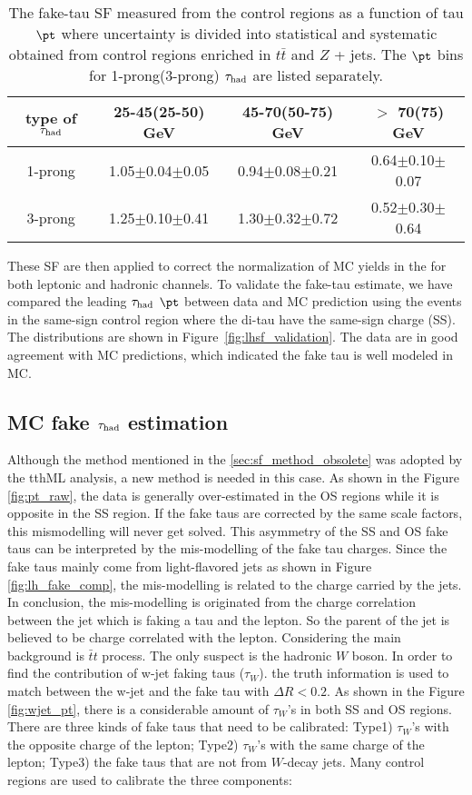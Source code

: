 \begin{table}[htb]
\caption{ The fake-tau SF measured from the control regions as a function of tau $\pt$ where uncertainty is divided into statistical and 
systematic obtained from control regions enriched in $t\bar t$ and $Z$ + jets. The $\pt$ bins for 1-prong(3-prong) $\tau_\text{had}$ are listed separately.}
\centering
\begin{tabular}{|c|c|c|c|} \hline
type of $\tau_\text{had}$  & 25-45(25-50) GeV & 45-70(50-75) GeV  & $>$ 70(75) GeV \\ \hline
1-prong & 1.05$\pm$0.04$\pm$0.05 & 0.94$\pm$0.08$\pm$0.21 & 0.64$\pm$0.10$\pm$0.07 \\
3-prong & 1.25$\pm$0.10$\pm$0.41 & 1.30$\pm$0.32$\pm$0.72 & 0.52$\pm$0.30$\pm$0.64 \\ \hline
\end{tabular}
\label{tab:faketauSF}
\end{table}

These SF are then applied to correct the normalization of MC yields in the for both leptonic and hadronic channels. 
To validate the fake-tau estimate, we have compared the leading $\tau_\text{had}$ $\pt$ between data and MC prediction using the events in 
the same-sign control region where the di-tau have the same-sign charge (SS).
The distributions are shown in Figure~\ref{fig:lhsf_validation}. The data are in good agreement with MC predictions, 
which indicated the fake tau is well modeled in MC. 

\subsection{MC fake $\tau_\text{had}$ estimation}
\label{sec:sf_method}

Although the method mentioned in the \ref{sec:sf_method_obsolete} was adopted by the tthML analysis, a new method is needed in this case. As shown in the Figure \ref{fig:pt_raw}, the data is generally over-estimated in the OS regions while it is opposite in the SS region. If the fake taus are corrected by the same scale factors, this mismodelling will never get solved. This asymmetry of the SS and OS fake taus can be interpreted by the mis-modelling of the fake tau charges. Since the fake taus mainly come from light-flavored jets as shown in Figure \ref{fig:lh_fake_comp}, the mis-modelling is related to the charge carried by the jets. In conclusion, the mis-modelling is originated from the charge correlation between the jet which is faking a tau and the lepton. So the parent of the jet is believed to be charge correlated with the lepton. Considering the main background is $\bar{t}t$ process. The only suspect is the hadronic $W$ boson. In order to find the contribution of w-jet faking taus ($\tau_{W}$).  the truth information is used to match between the w-jet and the fake tau with $\Delta R < 0.2$. As shown in the Figure \ref{fig:wjet_pt}, there is a considerable amount of $\tau_{W}$'s in both SS and OS regions. There are three kinds of fake taus that need to be calibrated: Type1) $\tau_{W}$'s with the opposite charge of the lepton; Type2) $\tau_{W}$'s with the same charge of the lepton; Type3) the fake taus that are not from $W$-decay jets. Many control regions are used to calibrate the three components:

